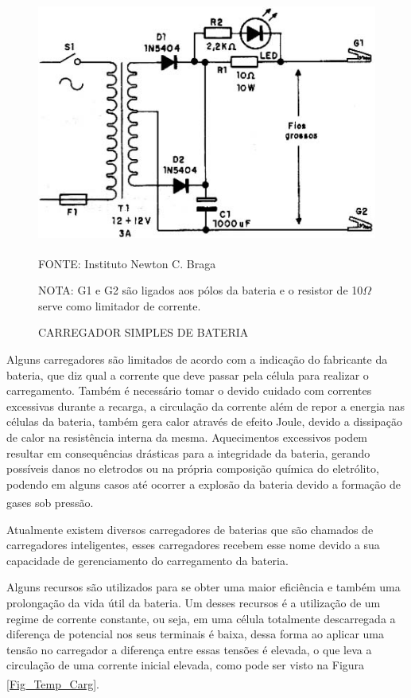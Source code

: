 \documentclass[
	12pt,				%
	openright,			%
	oneside,			%
	a4paper,			%
	english,			%
	french,				%
	spanish,			%
	brazil,				%
	oldfontcommands
	]{abntex2}
\begin{document}
	\begin{figure}[th]
		\caption{CARREGADOR SIMPLES DE BATERIA}
		\label{Fig_Carregador}
		\centering
		\includegraphics[width=0.5\linewidth]{./figs/carregador}
			
		\begin{small}
			FONTE: Instituto Newton C. Braga\textsuperscript{\cite{carregador}}
		\end{small}	
		
		\begin{footnotesize}
		NOTA: G1 e G2 são ligados aos pólos da bateria e o resistor de 10$\Omega$ serve como limitador de corrente.
		\end{footnotesize}	
	\end{figure}
	\pagebreak
	
	Alguns carregadores são limitados de acordo com a indicação do fabricante da bateria, que diz qual a corrente que deve passar pela célula para realizar o carregamento. Também é necessário tomar o devido cuidado com correntes excessivas durante a recarga, a circulação da corrente além de repor a energia nas células da bateria, também gera calor através de efeito Joule, devido a dissipação de calor na resistência interna da mesma. Aquecimentos excessivos podem resultar em consequências drásticas para a integridade da bateria, gerando possíveis danos no eletrodos ou na própria composição química do eletrólito, podendo em alguns casos até ocorrer a explosão da bateria devido a formação de gases sob pressão.\textsuperscript{\cite{carregador}}
	
	Atualmente existem diversos carregadores de baterias que são chamados de carregadores inteligentes, esses carregadores recebem esse nome devido a sua capacidade de gerenciamento do carregamento da bateria.
	
	Alguns recursos são utilizados para se obter uma maior eficiência e também uma prolongação da vida útil da bateria. Um desses recursos é a utilização de um regime de corrente constante, ou seja, em uma célula totalmente descarregada a diferença de potencial nos seus terminais é baixa, dessa forma ao aplicar uma tensão no carregador a diferença entre essas tensões é elevada, o que leva a circulação de uma corrente inicial elevada, como pode ser visto na Figura \ref{Fig_Temp_Carg}.\textsuperscript{\cite{carregador}}
	
\end{document}
